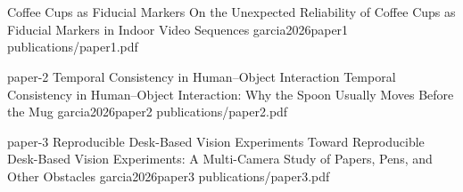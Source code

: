 %

\part{\myCompendiumSummaryPartTitle}
\label{part:compendium-summary}










\part{\myCompendiumPublicationsPartTitle}
\label{part:compendium-publications}

 {Coffee Cups as Fiducial Markers}
 {On the Unexpected Reliability of Coffee Cups as Fiducial Markers in Indoor Video Sequences}
 {garcia2026paper1}
 {publications/paper1.pdf}

 {paper-2}
 {Temporal Consistency in Human--Object Interaction}
 {Temporal Consistency in Human--Object Interaction: Why the Spoon Usually Moves Before the Mug}
 {garcia2026paper2}
 {publications/paper2.pdf}

 {paper-3}
 {Reproducible Desk-Based Vision Experiments}
 {Toward Reproducible Desk-Based Vision Experiments: A Multi-Camera Study of Papers, Pens, and Other Obstacles}
 {garcia2026paper3}
 {publications/paper3.pdf}

